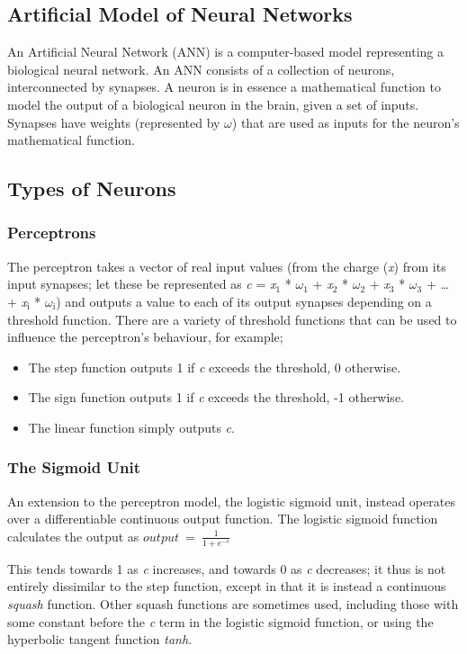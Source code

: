 \documentclass{acm_proc_article-sp}
\newcommand\textsubscript[1]{\ensuremath{{}_{\text{#1}}}}
\begin{document}
\subsection{Artificial Model of Neural Networks}
{
An Artificial Neural Network (ANN) is a computer{}-based model
representing a biological neural network. An ANN consists of a
collection of neurons, interconnected by synapses. A neuron is in
essence a mathematical function to model the output of a biological
neuron in the brain, given a set of inputs. Synapses have weights
(represented by ${\omega}$) that are used as inputs for the
neuron's mathematical function.
}

\subsection{Types of Neurons}
\subsubsection{Perceptrons}
{
The perceptron takes a vector of real input values (from the charge (\textit{x}) from its input synapses; let these be represented as \textit{c} = \textit{x}\textsubscript{1} * ${\omega}$\textsubscript{1} + \textit{x}\textsubscript{2} * ${\omega}$\textsubscript{2} + \textit{x}\textsubscript{3} * ${\omega}$\textsubscript{3} + {\dots} + \textit{x}\textsubscript{i} * ${\omega}$\textsubscript{i}) and outputs a value to each of its output synapses depending on a threshold function. There are a variety of threshold functions\cite{mitchell} that can be used to influence the perceptron's behaviour, for example;
}
\newpage
\begin{itemize}
\item {
The step function outputs 1 if \textit{c }exceeds the threshold, 0 otherwise.
}
\item {
The sign function outputs 1 if \textit{c} exceeds the threshold, {}-1 otherwise.
}

\item {
The linear function simply outputs \textit{c}.
}
\end{itemize}
\subsubsection{The Sigmoid Unit}
{
An extension to the perceptron model, the logistic sigmoid unit, instead operates over a differentiable continuous output function. The logistic sigmoid function calculates the output as  
$\mathit{output}\ =\ \frac{1}{1+e^{-c}}$

This tends towards 1 as {\textit{c}} increases, and towards 0 as {\textit{c}} decreases; it thus is not entirely dissimilar to the step function, except in that it is instead a continuous {\textit{squash}} function. Other squash functions are sometimes used, including those with some constant before the {\textit{c}} term in the logistic sigmoid function, or using the hyperbolic tangent function {\textit{tanh}}.
}
\end{document}
